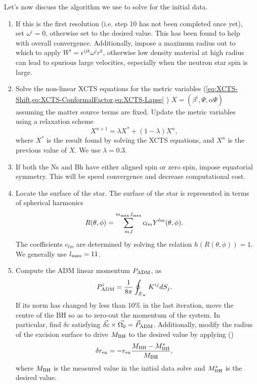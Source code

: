 Let's now discuss the algorithm we use to solve for the initial data. 

\begin{enumerate}
\item If this is the first resolution (i.e. step 10 has not been
  completed once yet), set $\omega^i=0$, otherwise set
  to the desired value. This has been found to help with overall
  convergence. Additionally, impose a maximum radius out to which to
  apply $W^i=\epsilon^{ijk}\omega^jr^k$, otherwise low density
  material at high radius can lead to spurious large velocities,
  especially when the neutron star spin is large.

\item Solve the non-linear XCTS equations for the metric variables (\cref{eq:XCTS-Shift,eq:XCTS-ConformalFactor,eq:XCTS-Lapse} )
  $X=\left(\beta^i,\Psi,\alpha\Psi\right)$ assuming the matter source
  terms are fixed. Update the metric variables using a relaxation
  scheme
\begin{equation}
\label{eq:Relaxation}
X^{n+1}=\lambda X^{*} + (1-\lambda)X^n,
\end{equation}
where $X^{*}$ is the result found by solving the XCTS equations, and $X^{n}$ is
the previous value of $X$.
We use $\lambda=0.3$.

\item If both the Ns and Bh have either aligned spin or zero spin,
  impose equatorial symmetry. This will be speed convergence and
  decrease computational cost.

\item Locate the surface of the star. The surface of the star is
  represented in terms of spherical harmonics
\begin{equation}
\label{eq:NSSurf}
R(\theta,\phi)=\sum_{m,l}^{m_{\rm max},l_{\rm max}} c_{lm}Y^{lm}(\theta,\phi)
.
\end{equation}
The coefficients $c_{lm}$ are determined by solving the relation $h\left(R\left(\theta,\phi\right)\right)=1$.
We generally use $l_{\rm max}=11$.

\item Compute the ADM linear momentum $P_{\rm ADM}$, as 
\begin{equation}
P_{\rm ADM}^i = \frac{1}{8\pi}\oint_{S_{\infty}}K^{ij}dS_j.
\end{equation}
If its norm has changed by less than 10\% in the last iteration, move
the centre of the BH so as to zero-out the momentum of the
system. In particular, find $\delta c$ satisfying $\vec{\delta c}
\times \vec{\Omega_0}=\vec{P}_{\rm ADM}$. Additionally, modify the radius of the excision surface to
drive $M_{\rm BH}$ to the desired value by applying (\cite{Buchman:2012dw})
\begin{equation}
\delta r_{\rm ex} = -r_{\rm ex} \frac{M_{\rm BH} - M_{\rm
    BH}^{*}}{M_{\rm BH}},
\end{equation}
where $M_{\rm BH}$ is the measured value in the initial data solve and
$M_{\rm BH}^{*}$ is the desired value.


\end{enumerate}
